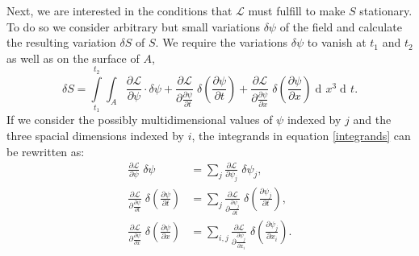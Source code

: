 \documentclass[prb,preprint]{revtex4-1}
\DeclareMathOperator{\dd}{d\!}
\begin{document}
Next, we are interested in the conditions that $\mathcal{L}$ must fulfill to make $S$ stationary.
To do so we consider arbitrary but small variations $\delta\psi$ of the field and calculate the resulting variation $\delta S$ of $S$. We require the variations $\delta\psi$ to vanish at $t_1$ and $t_2$ as well as on the surface of $A$,
\begin{equation}\label{integrands}
\delta S = \int\limits_{t_1}^{t_2} \int_{A} 
\frac{\partial \mathcal{L}}{\partial \psi} \cdot \delta \psi
+ \frac{\partial \mathcal{L}}{\partial \frac{\partial \psi}{\partial t}} \; \delta \left(\frac{\partial \psi} {\partial t}\right)
+ \frac{\partial \mathcal{L}}{\partial \frac{\partial \psi}{\partial x}}  \; \delta \left(\frac{\partial \psi} {\partial x}\right)
\dd x^3 \dd t.
\end{equation}
If we consider the possibly multidimensional values of $\psi$ indexed by $j$ and the three spacial dimensions indexed by $i$, the integrands in equation \eqref{integrands} can be rewritten as:
\begin{align}
\frac{\partial \mathcal{L}}{\partial \psi} \; \delta \psi
&= \sum_{j} \frac{\partial \mathcal{L}}{\partial \psi_{j}} \; \delta \psi_{j}, \\
\frac{\partial \mathcal{L}}{\partial \frac{\partial \psi}{\partial t}} \; \delta \left(\frac{\partial \psi} {\partial t}\right)
&= \sum_{j} \frac{\partial \mathcal{L}}{\partial \frac{\partial \psi_{j}}{\partial t}} \; \delta \left(\frac{\partial \psi_{j}} {\partial t}\right), \\
\frac{\partial \mathcal{L}}{\partial \frac{\partial \psi}{\partial x}} \; \delta \left(\frac{\partial \psi} {\partial x}\right)
&= \sum_{i,j} \frac{\partial \mathcal{L}}{\partial \frac{\partial \psi_{j}}{\partial x_{i}}} \; \delta \left(\frac{\partial \psi_{j}} {\partial x_{i}}\right).
\end{align}
\end{document}
